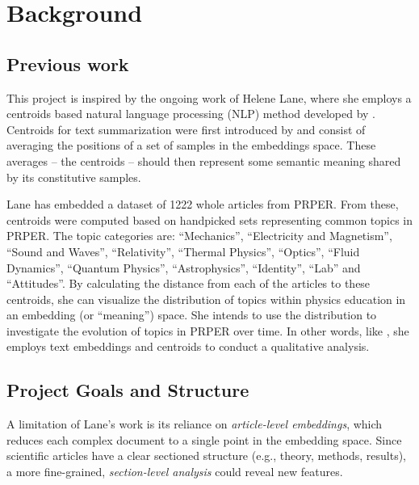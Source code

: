 \section{Background}

\subsection{Previous work}

This project is inspired by the ongoing work of Helene Lane, where she employs a
centroids based natural language processing (NLP) method developed by
\textcite{Odden2024Using}. Centroids for text summarization were first
introduced by \autocite{Radev2004Centroid} and consist of averaging the
positions of a set of samples in the embeddings space. These averages -- the
centroids -- should then represent some semantic meaning shared by its
constitutive samples.

Lane has embedded a dataset of 1222 whole articles from PRPER. From these,
centroids were computed based on handpicked sets representing common topics in
PRPER. The topic categories are: ``Mechanics'', ``Electricity and Magnetism'',
``Sound and Waves'', ``Relativity'', ``Thermal Physics'', ``Optics'', ``Fluid
Dynamics'', ``Quantum Physics'', ``Astrophysics'', ``Identity'', ``Lab'' and
``Attitudes''. By calculating the distance from each of the articles to these
centroids, she can visualize the distribution of topics within physics education
in an embedding (or ``meaning'') space. She intends to use the distribution to
investigate the evolution of topics in PRPER over time. In other words, like
\autocite{Odden2024Using}, she employs text embeddings and centroids to conduct
a qualitative analysis.


\subsection{Project Goals and Structure}

A limitation of Lane's work is its reliance on \emph{article-level embeddings},
which reduces each complex document to a single point in the embedding space.
Since scientific articles have a clear sectioned structure (e.g., theory,
methods, results), a more fine-grained, \emph{section-level analysis} could reveal
new features.


